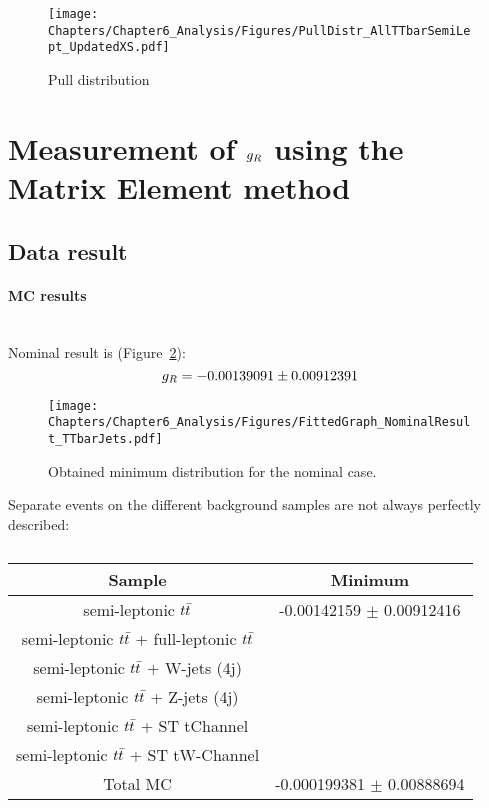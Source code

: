 \begin{figure}[h!t]
 \centering
 \texttt{[image: Chapters/Chapter6\_Analysis/Figures/PullDistr\_AllTTbarSemiLept\_UpdatedXS.pdf]}
 \caption{Pull distribution} \label{fig::PullDistr}
\end{figure}

\section{Measurement of $g_{R}$ using the Matrix Element method} \label{sec::gRMeas}

\subsection{Data result}
\paragraph{MC results } \hfill \\

Nominal result is (Figure~\ref{fig::MinNominal}):
\begin{equation}
 g_{R} = -0.00139091 \pm 0.00912391
\end{equation}

\begin{figure}[h!t]
 \centering
 \texttt{[image: Chapters/Chapter6\_Analysis/Figures/FittedGraph\_NominalResult\_TTbarJets.pdf]}
 \caption{Obtained minimum distribution for the nominal case.} \label{fig::MinNominal}
\end{figure}

Separate events on the different background samples are not always perfectly described:
\begin{table}[h!t]
 \centering
 \caption{} \label{table::BckInfl}
 \renewcommand{\arraystretch}{1.2}
 \begin{tabular}{c|c}
  Sample 						& Minimum 			\\
  \hline
  semi-leptonic $t\bar{t}$ 				& -0.00142159 $\pm$ 0.00912416 	\\
  semi-leptonic $t\bar{t}$ + full-leptonic $t\bar{t}$ 	&  	\\
  semi-leptonic $t\bar{t}$ + W-jets (4j) 			&  	\\
  semi-leptonic $t\bar{t}$ + Z-jets (4j) 			&  		\\
  semi-leptonic $t\bar{t}$ + ST tChannel 			&  	\\
  semi-leptonic $t\bar{t}$ + ST tW-Channel  		&  	\\
  \hline
  Total MC 			& -0.000199381 $\pm$ 0.00888694 
 \end{tabular}
\end{table}

